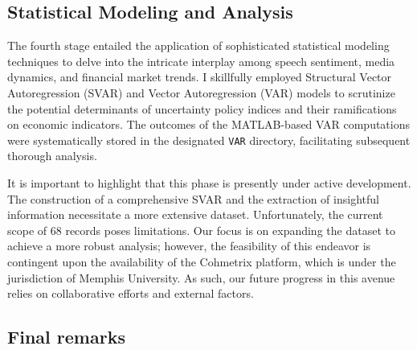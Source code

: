\documentclass{article}
\begin{document}
\subsection{Statistical Modeling and Analysis}

The fourth stage entailed the application of sophisticated statistical modeling techniques to delve into the intricate interplay among speech sentiment, media dynamics, and financial market trends. I skillfully employed Structural Vector Autoregression (SVAR) and Vector Autoregression (VAR) models to scrutinize the potential determinants of uncertainty policy indices and their ramifications on economic indicators. The outcomes of the MATLAB-based VAR computations were systematically stored in the designated \texttt{VAR} directory, facilitating subsequent thorough analysis.
\par
It is important to highlight that this phase is presently under active development. The construction of a comprehensive SVAR and the extraction of insightful information necessitate a more extensive dataset. Unfortunately, the current scope of 68 records poses limitations. Our focus is on expanding the dataset to achieve a more robust analysis; however, the feasibility of this endeavor is contingent upon the availability of the Cohmetrix platform, which is under the jurisdiction of Memphis University. As such, our future progress in this avenue relies on collaborative efforts and external factors.

\subsection{Final remarks}
\end{document}
